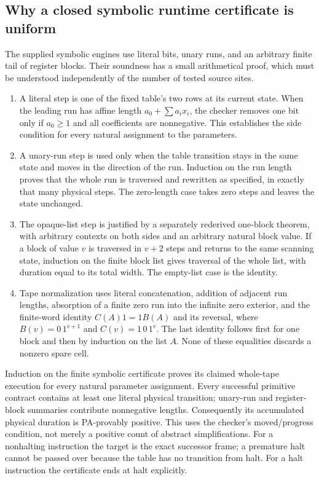\subsection{Why a closed symbolic runtime certificate is uniform}

The supplied symbolic engines use literal bits, unary runs, and an
arbitrary finite tail of register blocks.  Their soundness has a small
arithmetical proof, which must be understood independently of the
number of tested source sites.
\begin{enumerate}
\item A literal step is one of the fixed table's two rows at its current
state.  When the leading run has affine length $a_0+\sum a_i x_i$,
the checker removes one bit only if $a_0\geq1$ and all coefficients
are nonnegative.  This establishes the side condition for every
natural assignment to the parameters.
\item A unary-run step is used only when the table transition stays
in the same state and moves in the direction of the run.  Induction on
the run length proves that the whole run is traversed and rewritten as
specified, in exactly that many physical steps.  The zero-length case
takes zero steps and leaves the state unchanged.
\item The opaque-list step is justified by a separately rederived
one-block theorem, with arbitrary contexts on both sides and an
arbitrary natural block value.  If a block of value $v$ is traversed
in $v+2$ steps and returns to the same scanning state, induction on
the finite block list gives traversal of the whole list, with duration
equal to its total width.  The empty-list case is the identity.
\item Tape normalization uses literal concatenation, addition of
adjacent run lengths, absorption of a finite zero run into the infinite
zero exterior, and the finite-word identity
$C(A)1=1B(A)$ and its reversal, where
$B(v)=0\,1^{v+1}$ and $C(v)=1\,0\,1^v$.
The last identity follows first for one block and then by induction on
the list $A$.  None of these equalities discards a nonzero spare cell.
\end{enumerate}
Induction on the finite symbolic certificate proves its claimed whole-tape
execution for every natural parameter assignment.  Every successful
primitive contract contains at least one literal physical transition;
unary-run and register-block summaries contribute nonnegative lengths.
Consequently its accumulated physical duration is PA-provably positive.
This uses the checker's moved/progress condition, not merely a positive
count of abstract simplifications.  For a nonhalting instruction the
target is the exact successor frame; a premature halt
cannot be passed over because the table has no transition from halt.
For a halt instruction the certificate ends at halt explicitly.

